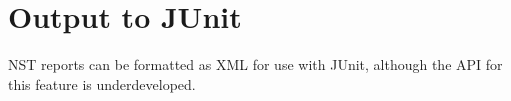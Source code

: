 
\section{Output to JUnit}
\label{sec:junit}
NST reports can be formatted as XML for use with JUnit, although the
API for this feature is underdeveloped.



